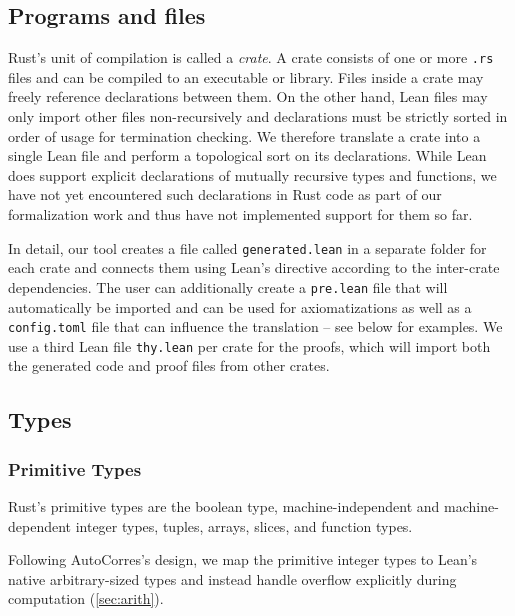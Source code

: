 
\subsection{Programs and files}

Rust's unit of compilation is called a \emph{crate}. A crate consists of one or
more \texttt{.rs} files and can be compiled to an executable or library. Files
inside a crate may freely reference declarations between them. On the other
hand, Lean files may only import other files non-recursively and declarations
must be strictly sorted in order of usage for termination checking. We therefore
translate a crate into a single Lean file and perform a topological sort on its
declarations. While Lean does support explicit declarations of mutually
recursive types and functions, we have not yet encountered such declarations in
Rust code as part of our formalization work and thus have not implemented support for them so far.

In detail, our tool creates a file called \verb!generated.lean! in a separate
folder for each crate and connects them using Lean's  directive
according to the inter-crate dependencies. The user can additionally create a
\verb!pre.lean! file that will automatically be imported and can be used for
axiomatizations as well as a \verb!config.toml! file that can influence the
translation -- see below for examples. We use a third Lean file \verb!thy.lean! per crate
for the proofs, which will import both the generated code and proof files from
other crates.

\subsection{Types}

\subsubsection{Primitive Types}

Rust's primitive types are the boolean type, machine-independent and machine-dependent integer
types, tuples, arrays, slices, and function types.

Following AutoCorres's design, we map the primitive integer types to
Lean's native arbitrary-sized types and instead handle overflow explicitly
during computation (\autoref{sec:arith}).

